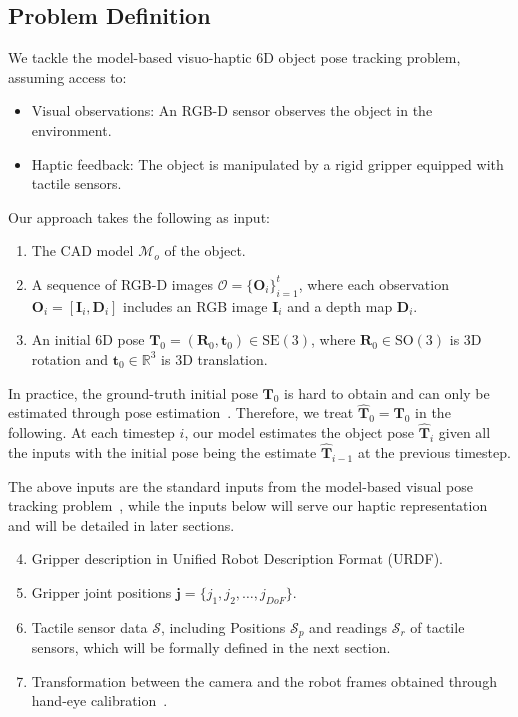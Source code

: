 \documentclass[11pt, a4paper, logo, twocolumn]{brown}
\begin{document}
\subsection{Problem Definition}
We tackle the model-based visuo-haptic 6D object pose tracking problem, assuming access to:
\begin{itemize}
    \item Visual observations: An RGB-D sensor observes the object in the environment.
    \item Haptic feedback: The object is manipulated by a rigid gripper equipped with tactile sensors.
\end{itemize}
Our approach takes the following as input:
\begin{enumerate}
    \item The CAD model $\mathcal{M}_o$ of the object.
    \item A sequence of RGB-D images $\mathcal{O} = \{ \mathbf{O}_i \}_{i=1}^t$, where each observation $\mathbf{O}_i = [\mathbf{I}_i, \mathbf{D}_i]$ includes an RGB image $\mathbf{I}_i$ and a depth map $\mathbf{D}_i$.
    \item An initial 6D pose $\mathbf{T}_0 = (\mathbf{R}_0, \mathbf{t}_0) \in \text{SE}(3)$, where ${\mathbf{R}_0 \in \text{SO}(3)}$ is 3D rotation and ${\mathbf{t}_0 \in \mathbb{R}^3}$ is 3D translation. 
\end{enumerate}
In practice, the ground-truth initial pose $\mathbf{T}_0$ is hard to obtain and can only be estimated through pose estimation~\cite{xiang_posecnn_2018, wang_densefusion_2019, park_pix2pose_2019, li_mrc-net_2024, wang_normalized_2019, lee_tta-cope_2023, wen_foundationpose_2024, labbe_megapose_2022, he_onepose_2022, liu_gen6d_2022, lin_sam-6d_2024, tremblay_deep_2018, wen_robust_2020}.
Therefore, we treat $\widehat{\mathbf{T}}_0 = \mathbf{T}_0$ in the following.
At each timestep $i$, our model estimates the object pose $\widehat{\mathbf{T}}_i$ given all the inputs with the initial pose being the estimate $\widehat{\mathbf{T}}_{i-1}$ at the previous timestep.

The above inputs are the standard inputs from the model-based visual pose tracking problem~\cite{wen_se3-tracknet_2020, deng_poserbpf_2021}, while the inputs below will serve our haptic representation and will be detailed in later sections.
\begin{enumerate}
    \setcounter{enumi}{3}
    \item Gripper description in Unified Robot Description Format (URDF).
    \item Gripper joint positions $\mathbf{j} = \{j_1, j_2, \dots, j_{DoF}\}$.
    \item Tactile sensor data $\mathcal{S}$, including Positions $\mathcal{S}_p$ and readings $\mathcal{S}_r$ of tactile sensors, which will be formally defined in the next section.
    \item Transformation between the camera and the robot frames obtained through hand-eye calibration~\cite{marchand_visp_2005}.
\end{enumerate}
\end{document}
